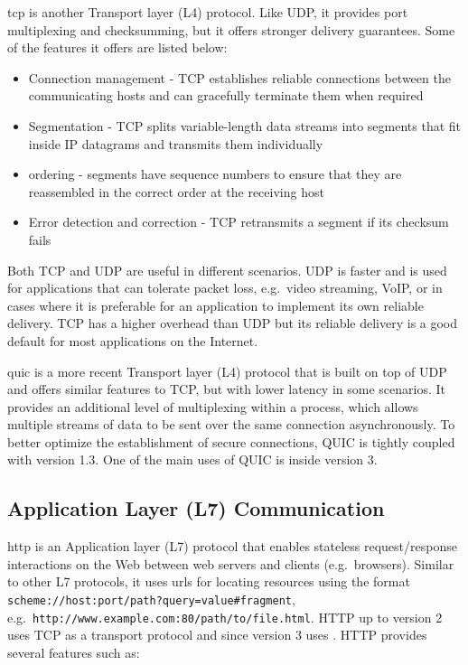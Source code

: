 \gls{tcp} is another Transport layer (L4) protocol. Like UDP, it
provides port multiplexing and checksumming, but it offers stronger
delivery guarantees. Some of the features it offers are listed below:

\begin{itemize}
\tightlist
\item
  Connection management - TCP establishes reliable connections between
  the communicating hosts and can gracefully terminate them when
  required
\item
  Segmentation - TCP splits variable-length data streams into segments
  that fit inside IP datagrams and transmits them individually
\item
  ordering - segments have sequence numbers to ensure that they are
  reassembled in the correct order at the receiving host
\item
  Error detection and correction - TCP retransmits a segment if its
  checksum fails
\end{itemize}

Both TCP and UDP are useful in different scenarios. UDP is faster and is
used for applications that can tolerate packet loss, e.g.~video
streaming, VoIP, or in cases where it is preferable for an application
to implement its own reliable delivery. TCP has a higher overhead than
UDP but its reliable delivery is a good default for most applications on
the Internet.

\gls{quic} is a more recent Transport layer (L4) protocol that is built
on top of UDP and offers similar features to TCP, but with lower latency
in some scenarios. It provides an additional level of multiplexing
within a process, which allows multiple streams of data to be sent over
the same connection asynchronously. To better optimize the establishment
of secure connections, QUIC is tightly coupled with 
version 1.3. One of the main uses of QUIC is inside 
version 3.

\hypertarget{application-layer-l7-communication}{%
\subsection{Application Layer (L7)
Communication}\label{application-layer-l7-communication}}

\gls{http} is an Application layer (L7) protocol that enables stateless
request/response interactions on the Web between web servers and clients
(e.g.~browsers). Similar to other L7 protocols, it uses \glspl{url} for
locating resources using the format
\texttt{scheme://host:port/path?query=value\#fragment},
e.g.~\texttt{http://www.example.com:80/path/to/file.html}. HTTP up to
version 2 uses TCP as a transport protocol and since version 3 uses
. HTTP provides several features such as:

